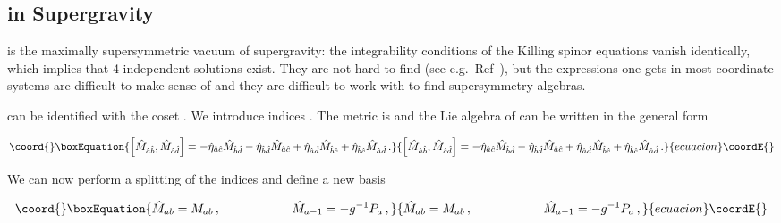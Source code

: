 \documentclass[12pt,a4paper]{article}
\begin{document}
\subsection{\coordHE{} in \coordHE{}  \coordHE{} Supergravity}
\label{sec-AdSKS}

\coordHE{} is the maximally supersymmetric vacuum of \coordHE{}  \coordHE{}
supergravity: the integrability conditions of the Killing spinor
equations vanish identically, which implies that 4 independent
solutions exist. They are not hard to find (see
e.g.~Ref~\cite{Lu:1998nu}), but the expressions one gets in most
coordinate systems are difficult to make sense of and they are
difficult to work with to find supersymmetry algebras.

\coordHE{} can be identified with the coset \coordHE{}. We
introduce \coordHE{} indices \coordHE{}. The
metric is \coordHE{} and
\coordHE{} the Lie algebra of \coordHE{} can be written in
the general form

\begin{equation}\coord{}\boxEquation{
\label{eq:AdSalgebra}
\left[\hat{M}_{\hat{a}\hat{b}},\hat{M}_{\hat{c}\hat{d}} \right]  =
-\hat{\eta}_{\hat{a}\hat{c}} \hat{M}_{\hat{b}\hat{d}} 
-\hat{\eta}_{\hat{b}\hat{d}} \hat{M}_{\hat{a}\hat{c}}
+\hat{\eta}_{\hat{a}\hat{d}} \hat{M}_{\hat{b}\hat{c}} 
+\hat{\eta}_{\hat{b}\hat{c}} \hat{M}_{\hat{a}\hat{d}}\, .
}{
\left[\hat{M}_{\hat{a}\hat{b}},\hat{M}_{\hat{c}\hat{d}} \right]  =
-\hat{\eta}_{\hat{a}\hat{c}} \hat{M}_{\hat{b}\hat{d}} 
-\hat{\eta}_{\hat{b}\hat{d}} \hat{M}_{\hat{a}\hat{c}}
+\hat{\eta}_{\hat{a}\hat{d}} \hat{M}_{\hat{b}\hat{c}} 
+\hat{\eta}_{\hat{b}\hat{c}} \hat{M}_{\hat{a}\hat{d}}\, .
}{ecuacion}\coordE{}\end{equation}


We can now perform a \coordHE{} splitting of the indices \coordHE{} and define a new basis 

\begin{equation}\coord{}\boxEquation{
\label{eq:contraction1}
\hat{M}_{ab} = M_{ab}\, ,
\hspace{2cm}
\hat{M}_{a-1} = -g^{-1} P_{a}\, ,
}{
\hat{M}_{ab} = M_{ab}\, ,
\hspace{2cm}
\hat{M}_{a-1} = -g^{-1} P_{a}\, ,
}{ecuacion}\coordE{}\end{equation}
\end{document}
